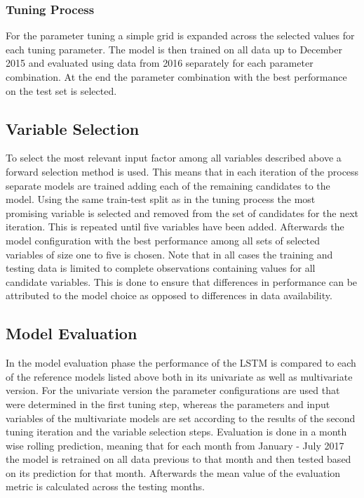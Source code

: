 \subsubsection{Tuning Process}
For the parameter tuning a simple grid is expanded across the selected values for each tuning parameter. The model is then trained on all data up to December 2015 and evaluated using data from 2016 separately for each parameter combination. At the end the parameter combination with the best performance on the test set is selected.
\subsection{Variable Selection}
To select the most relevant input factor among all variables described above a forward selection method is used. This means that in each iteration of the process separate models are trained adding each of the remaining candidates to the model. Using the same train-test split as in the tuning process the most promising variable is  selected and removed from the set of candidates for the next iteration. This is repeated until five variables have been added. Afterwards the model configuration with the best performance among all sets of selected variables of size one to five is chosen. Note that in all cases the training and testing data is limited to complete observations containing values for all candidate variables. This is done to ensure that differences in performance can be attributed to the model choice as opposed to differences in data availability.
\subsection{Model Evaluation}
In the model evaluation phase the performance of the LSTM is compared to each of the reference models listed above both in its univariate as well as multivariate version. For the univariate version the parameter configurations are used that were determined in the first tuning step, whereas the parameters and input variables of the multivariate models are set according to the results of the second tuning iteration and the variable selection steps. Evaluation is done in a month wise rolling prediction, meaning that for each month from January - July 2017 the model is retrained on all data previous to that month and then tested based on its prediction for that month. Afterwards the mean value of the evaluation metric is calculated across the testing months.
